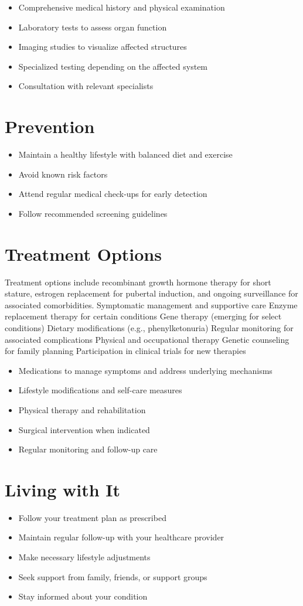 \begin{itemize}[noitemsep]
  \item Comprehensive medical history and physical examination
  \item Laboratory tests to assess organ function
  \item Imaging studies to visualize affected structures
  \item Specialized testing depending on the affected system
  \item Consultation with relevant specialists
\end{itemize}
\section{Prevention}
\begin{itemize}[noitemsep]
  \item Maintain a healthy lifestyle with balanced diet and exercise
  \item Avoid known risk factors
  \item Attend regular medical check-ups for early detection
  \item Follow recommended screening guidelines
\end{itemize}
\section{Treatment Options}
Treatment options include recombinant growth hormone therapy for short stature, estrogen replacement for pubertal induction, and ongoing surveillance for associated comorbidities. Symptomatic management and supportive care Enzyme replacement therapy for certain conditions Gene therapy (emerging for select conditions) Dietary modifications (e.g., phenylketonuria) Regular monitoring for associated complications Physical and occupational therapy Genetic counseling for family planning Participation in clinical trials for new therapies

\begin{itemize}[noitemsep]
  \item Medications to manage symptoms and address underlying mechanisms
  \item Lifestyle modifications and self-care measures
  \item Physical therapy and rehabilitation
  \item Surgical intervention when indicated
  \item Regular monitoring and follow-up care
\end{itemize}
\section{Living with It}
\begin{itemize}[noitemsep]
  \item Follow your treatment plan as prescribed
  \item Maintain regular follow-up with your healthcare provider
  \item Make necessary lifestyle adjustments
  \item Seek support from family, friends, or support groups
  \item Stay informed about your condition
\end{itemize}

